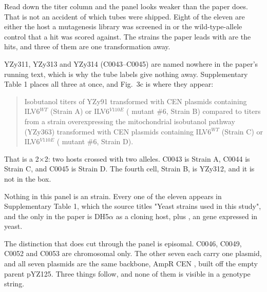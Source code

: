 

 Read down
the titer column and the panel looks weaker than the paper does. That is not an
accident of which tubes were shipped. Eight of the eleven are either the host a
mutagenesis library was screened in or the wild-type-allele control that a hit
was scored against. The strains the paper leads with are the hits, and three of
them are one transformation away.



 YZy311, YZy313 and
YZy314 (C0043--C0045) are named nowhere in the paper's running text, which is
why the tube labels give nothing away. Supplementary Table 1 places all three at
once, and Fig.~3c is where they appear:

\begin{quote}\small
Isobutanol titers of YZy91 transformed with CEN plasmids containing ILV6$^{WT}$
(Strain A) or ILV6$^{V110E}$ ( mutant \#6, Strain B) compared to
titers from a strain overexpressing the mitochondrial isobutanol pathway
(YZy363) transformed with CEN plasmids containing ILV6$^{WT}$ (Strain C) or
ILV6$^{V110E}$ ( mutant \#6, Strain D).
\end{quote}

\noindent
That is a 2$\times$2: two hosts crossed with two  alleles. C0043 is
Strain A, C0044 is Strain C, and C0045 is Strain D. The fourth cell, Strain B,
is YZy312, and it is not in the box.



 Nothing in
this panel is an  strain. Every one of the eleven appears in
Supplementary Table 1, which the source titles "Yeast strains used in this
study", and the only  in the paper is DH5$\alpha$ as a cloning
host, plus , an  gene expressed in yeast.

The distinction that does cut through the panel is episomal. C0046, C0049, C0052
and C0053 are chromosomal only. The other seven each carry one plasmid, and all
seven plasmids are the same backbone, AmpR CEN , built off the empty
parent pYZ125. Three things follow, and none of them is visible in a genotype
string.

